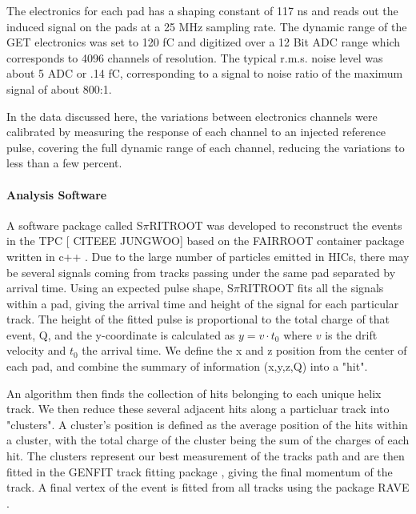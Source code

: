 \documentclass[review]{elsarticle}
\begin{document}
The electronics for each pad has a shaping constant of 117 ns and reads out the induced signal on the pads at a 25 MHz sampling rate. The dynamic range of the GET electronics was set to 120 fC and digitized over a 12 Bit ADC range which corresponds to 4096 channels of resolution. The typical r.m.s. noise level was about 5 ADC or .14 fC, corresponding to a signal to noise ratio of the maximum signal of about 800:1. 

In the data discussed here, the variations between electronics channels were calibrated by measuring the response of each channel to an injected reference pulse, covering the full dynamic range of each channel, reducing the variations to less than a few percent.
 
\paragraph{Analysis Software}
A software package called S$\pi$RITROOT was developed to reconstruct the events in the TPC [ CITEEE JUNGWOO] based on the FAIRROOT container package written in c++ \cite{fairroot}. Due to the large number of particles emitted in HICs, there may be several signals coming from tracks passing under the same pad separated by arrival time. Using an expected pulse shape, S$\pi$RITROOT fits all the signals within a pad, giving the arrival time and height of the signal for each particular track. The height of the fitted pulse is proportional to the total charge of that event, Q, and the y-coordinate is calculated as $y = v\cdot t_0$ where $v$ is the drift velocity and $t_0$ the arrival time. We define the x and z position from the center of each pad, and combine the summary of information (x,y,z,Q) into a "hit". 

 An algorithm then finds the collection of hits belonging to each unique helix track. We then reduce these several adjacent hits along a particluar track into "clusters". A cluster's position is defined as the average position of the hits within a cluster, with the total charge of the cluster being the sum of the charges of each hit. The clusters represent our best measurement of the tracks path and are then fitted in the GENFIT track fitting package \cite{genfit}, giving the final momentum of the track. A final vertex of the event is fitted from all tracks using the package RAVE \cite{rave}. 
 
\end{document}
